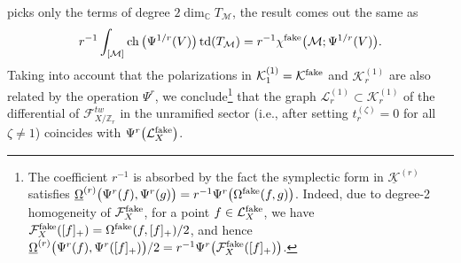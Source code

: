 \documentclass[pdftex]{sigma}
\def\F{\mathcal F}
\def\K{\mathcal K}
\def\L{\mathcal L}
\def\M{\mathcal M}
\def\ZZ{\mathbb Z}
\def\CC{\mathbb C}
\def\td{\operatorname{td}}
\def\ch{\operatorname{ch}}
\def\und{\underline}
\begin{document}
 picks only the terms of degree $2\dim_{\CC} T_{\M}$, the result comes out the same as
 \[ r^{-1} \int_{[\M]} \ch \big(\Psi^{1/r}(V)\big) \td (T_{\M}) = r^{-1} \chi^{\rm fake}\big(\M ;
 \Psi^{1/r}(V)\big).\]
 Taking into account that the polarizations in $\K_1^{(1)}=\K^{\rm fake}$ and $\K_r^{(1)}$ are also related by the operation $\Psi^r$, we conclude\footnote{The coefficient $r^{-1}$ is absorbed by the fact the symplectic form in $\und{\K}^{(r)}$ satisfies
$\und{\Omega}^{(r)} \big(\Psi^r(f),\Psi^r(g)\big) = r^{-1}\Psi^r \big(\Omega^{\rm fake}(f, g)\big)$.
Indeed, due to degree-2 homogeneity of $\F_X^{\rm fake}$, for a point $f\in \L_X^{\rm fake}$, we have $\F_X^{\rm fake}([f]_+) = \Omega^{\rm fake}(f,[f]_{+})/2$, and hence
$\und{\Omega}^{(r)}\big(\Psi^r(f),\Psi^r([f]_{+})\big)/2=r^{-1}\Psi^r
\big(\F_X^{\rm fake}([f]_{+})\big)$.} that
 the graph $\L_r^{(1)}\subset \K_r^{(1)}$ of the differential of $\F_{X/\ZZ_r}^{tw}$
 in the unramified sector (i.e., after setting $t_r^{(\zeta)}=0$ for all $\zeta\neq 1$) coincides with $\Psi^r\big(\L_X^{\rm fake}\big)$.
\end{document}
